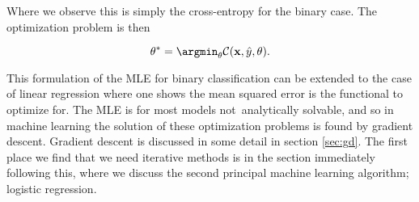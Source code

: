 \noindent Where we observe this is simply the cross-entropy for the binary case. The optimization problem is then 

\begin{equation}
\theta^* = \argmin_\theta \mathcal{C}(\mathbf{x}, \hat{y}, \theta ).
\end{equation}

\noindent This formulation of the MLE for binary classification can be extended to the case of linear regression where one shows the mean squared error is the functional to optimize for. The MLE  is for most models not analytically solvable, and so in machine learning the solution of these optimization problems is found by gradient descent. Gradient descent is discussed in some detail in section \ref{sec:gd}. The first place we find that we need iterative methods is in the section immediately following this, where we discuss the second principal machine learning algorithm; logistic regression.